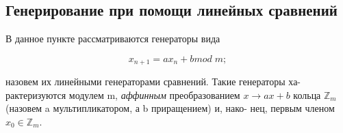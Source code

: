 \documentclass{../template/mai_book}
\begin{document}
\subsection{Генерирование при помощи линейных сравнений}

\noindent В данное пункте рассматриваются генераторы вида \par 
$$x_{n+1} = ax_{n} + b mod \; m;$$ \par
\noindent назовем их линейными генераторами сравнений. Такие генераторы ха- \linebreak рактеризуются модулем m, \textit{аффинным} преобразованием $x \to ax + b$ кольца $\mathbb{Z}_{m}$ (назовем a мультипликатором, а b приращением) и, нако- \linebreak нец, первым членом $x_{0} \in \mathbb{Z}_{m}$. \par \newpage 

\end{document}

